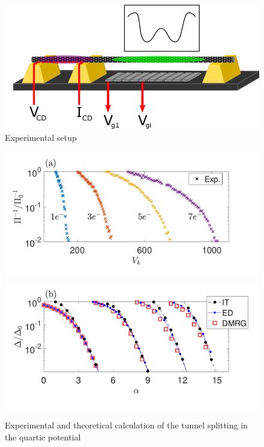 \documentclass[prl,twocolumn,showpacs,preprintnumbers,amsmath,amssymb, superscriptaddress]{revtex4-2}
\newcommand{\1}{{1\hspace*{-0.5ex} \textrm{l} \hspace*{0.5ex}}}
\begin{document}
\begin{figure}[tbh!]
  	\begin{center}
   		\includegraphics[width=0.95\columnwidth]{Experimental_Setup.png}
   		\caption{Experimental setup}
   		\label{fig:experimental_setup}
  		\end{center}
	\end{figure}



	\begin{figure}[tbh!]
		\begin{center}
		 	\includegraphics[width=0.9\columnwidth]{Fig_spectral_gap_exp_log_lin.pdf}
		 	\includegraphics[width=0.9\columnwidth]{Fig_spectral_gap_theor.pdf}
		 	\caption{Experimental and theoretical calculation of the tunnel splitting in the quartic potential}
		 	\label{fig:gap}
		\end{center}
	\end{figure}
	  
\end{document}
